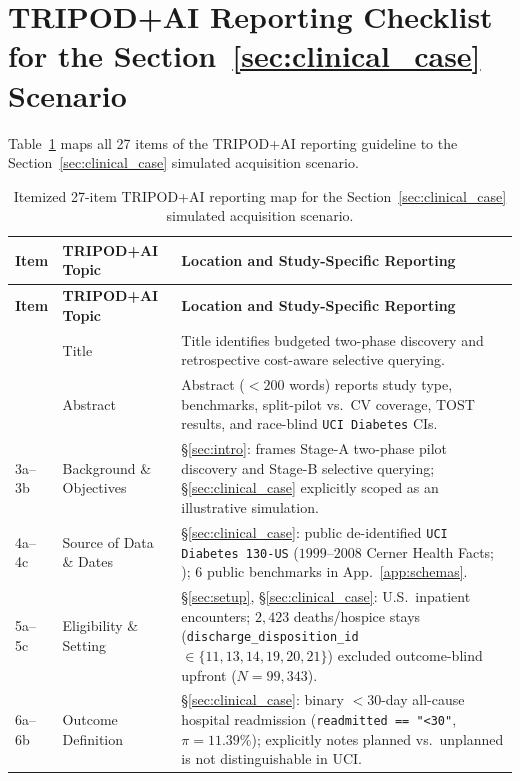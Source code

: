 \documentclass[11pt]{article}
\theoremstyle{remark}
\begin{document}
\section{TRIPOD+AI Reporting Checklist for the Section~\ref{sec:clinical_case} Scenario}
\label{app:tripod}

Table~\ref{tab:tripod_checklist} maps all 27 items of the TRIPOD+AI reporting guideline \citep{collins2024tripodai} to the Section~\ref{sec:clinical_case} simulated acquisition scenario.

{\footnotesize
\begin{longtable}{>{\raggedright\arraybackslash}p{1.2cm}>{\raggedright\arraybackslash}p{4.3cm}>{\raggedright\arraybackslash}p{9.3cm}}
\caption{Itemized 27-item TRIPOD+AI reporting map for the Section~\ref{sec:clinical_case} simulated acquisition scenario.}
\label{tab:tripod_checklist} \\
\toprule
\textbf{Item} & \textbf{TRIPOD+AI Topic} & \textbf{Location and Study-Specific Reporting} \\
\midrule
\endfirsthead
\toprule
\textbf{Item} & \textbf{TRIPOD+AI Topic} & \textbf{Location and Study-Specific Reporting} \\
\midrule
\endhead
\bottomrule
\endfoot
1 & Title & Title identifies budgeted two-phase discovery and retrospective cost-aware selective querying. \\
2 & Abstract & Abstract ($<200$ words) reports study type, benchmarks, split-pilot vs.\ CV coverage, TOST results, and race-blind \texttt{UCI Diabetes} CIs. \\
3a--3b & Background \& Objectives & \S\ref{sec:intro}: frames Stage-A two-phase pilot discovery and Stage-B selective querying; \S\ref{sec:clinical_case} explicitly scoped as an illustrative simulation. \\
4a--4c & Source of Data \& Dates & \S\ref{sec:clinical_case}: public de-identified \texttt{UCI Diabetes 130-US} ($1999\text{--}2008$ Cerner Health Facts; \citealp{strack2014impact}); $6$ public benchmarks in App.~\ref{app:schemas}. \\
5a--5c & Eligibility \& Setting & \S\ref{sec:setup}, \S\ref{sec:clinical_case}: U.S.\ inpatient encounters; $2{,}423$ deaths/hospice stays (\texttt{discharge\_disposition\_id} $\in \{11,13,14,19,20,21\}$) excluded outcome-blind upfront ($N=99{,}343$). \\
6a--6b & Outcome Definition & \S\ref{sec:clinical_case}: binary $<30$-day all-cause hospital readmission (\texttt{readmitted == "<30"}, $\pi=11.39\%$); explicitly notes planned vs.\ unplanned is not distinguishable in UCI. \\

\end{longtable}}
\end{document}
